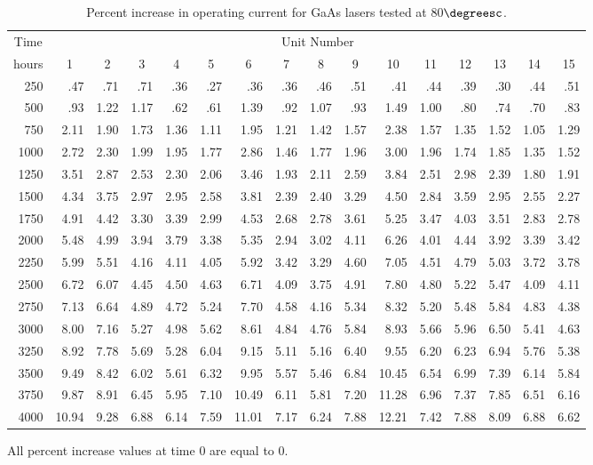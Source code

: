 \begin{sidewaystable}
\caption{Percent increase in
operating current for GaAs lasers tested at 80$\degreesc$.}
\centering\small
\begin{tabular}{*{16}{r}}
\hline
 \multicolumn{1}{c}{Time} 
&\multicolumn{15}{c}{Unit Number}
\\
\multicolumn{1}{c}{hours}
&\multicolumn{1}{c}{1}
&\multicolumn{1}{c}{2}
&\multicolumn{1}{c}{3}
&\multicolumn{1}{c}{4}
&\multicolumn{1}{c}{5}
&\multicolumn{1}{c}{6}
&\multicolumn{1}{c}{7}
&\multicolumn{1}{c}{8}
&\multicolumn{1}{c}{9}
&\multicolumn{1}{c}{10}
&\multicolumn{1}{c}{11}
&\multicolumn{1}{c}{12}
&\multicolumn{1}{c}{13}
&\multicolumn{1}{c}{14}
&\multicolumn{1}{c}{15}
\\[.7ex]
\cline{1-16}
250&
.47&.71&.71&.36&.27&.36&.36&.46&.51&.41&.44&.39&.30&.44&.51\\
500&
 .93&1.22&1.17&.62&.61&1.39&.92&1.07&.93&1.49&1.00&.80&.74&.70&.83\\
750 &
2.11&1.90&1.73&1.36&1.11&1.95&1.21&1.42&1.57&2.38&1.57&1.35&1.52&1.05&1.29\\
1000 &
2.72&2.30&1.99&1.95&1.77&2.86&1.46&1.77&1.96&3.00&1.96&1.74&1.85&1.35&1.52\\[.7ex]
1250&
3.51&2.87&2.53&2.30&2.06&3.46&1.93&2.11&2.59&3.84&2.51&2.98&2.39&1.80&1.91\\
1500&
4.34&3.75&2.97&2.95&2.58&3.81&2.39&2.40&3.29&4.50&2.84&3.59&2.95&2.55&2.27\\
1750&
4.91&4.42&3.30&3.39&2.99&4.53&2.68&2.78&3.61&5.25&3.47&4.03&3.51&2.83&2.78\\
2000&
5.48&4.99&3.94&3.79&3.38&5.35&2.94&3.02&4.11&6.26&4.01&4.44&3.92&3.39&3.42\\[.7ex]
2250&
5.99&5.51&4.16&4.11&4.05&5.92&3.42&3.29&4.60&7.05&4.51&4.79&5.03&3.72&3.78\\
2500&
6.72&6.07&4.45&4.50&4.63&6.71&4.09&3.75&4.91&7.80&4.80&5.22&5.47&4.09&4.11\\
2750&
7.13&6.64&4.89&4.72&5.24&7.70&4.58&4.16&5.34&8.32&5.20&5.48&5.84&4.83&4.38\\
3000&
8.00&7.16&5.27&4.98&5.62&8.61&4.84&4.76&5.84&8.93&5.66&5.96&6.50&5.41&4.63\\[.7ex]
3250&
8.92&7.78&5.69&5.28&6.04&9.15&5.11&5.16&6.40&9.55&6.20&6.23&6.94&5.76&5.38\\
3500&
 9.49&8.42&6.02&5.61&6.32&9.95&5.57&5.46&6.84&10.45&6.54&6.99&7.39&6.14&5.84\\
3750&
 9.87&8.91&6.45&5.95&7.10&10.49&6.11&5.81&7.20&11.28&6.96&7.37&7.85&6.51&6.16\\
4000&
10.94&9.28&6.88&6.14&7.59&11.01&7.17&6.24&7.88&12.21&7.42&7.88&8.09&6.88&6.62\\
\hline
\end{tabular}
\begin{minipage}[t]{7in}
All percent increase values at time 0 are equal to 0.
\end{minipage}
\label{atable:GaAs.laser.degradation.data}
\end{sidewaystable}

